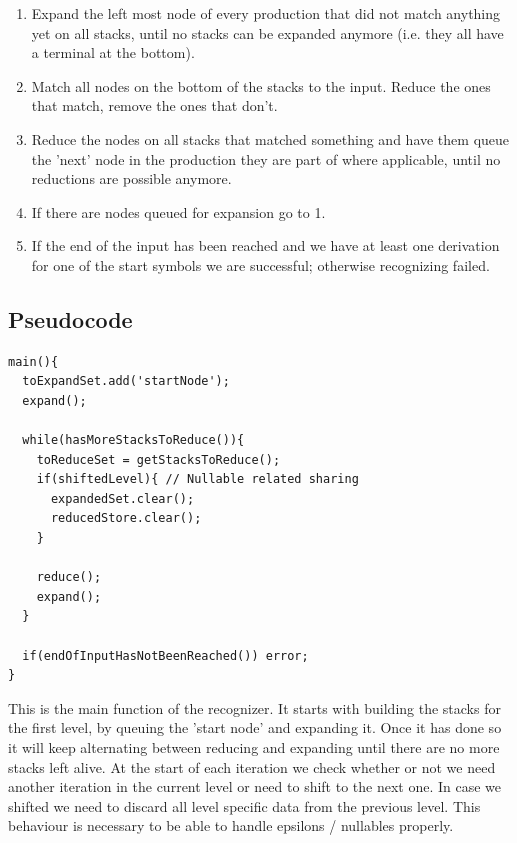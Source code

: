 \documentclass[a4paper,10pt]{article}
\begin{document}
\begin{enumerate}
 \setlength{\itemsep}{0pt}
 \setlength{\parskip}{0pt}
 \setlength{\parsep}{0pt}

 \item Expand the left most node of every production that did not match anything yet on all stacks, until no stacks can be expanded anymore (i.e. they all have a terminal at the bottom).
 \item Match all nodes on the bottom of the stacks to the input. Reduce the ones that match, remove the ones that don't.
 \item Reduce the nodes on all stacks that matched something and have them queue the 'next' node in the production they are part of where applicable, until no reductions are possible anymore.
 \item If there are nodes queued for expansion go to 1.
 \item If the end of the input has been reached and we have at least one derivation for one of the start symbols we are successful; otherwise recognizing failed.
\end{enumerate}

\subsection{Pseudocode}

{\small
\begin{verbatim}
main(){
  toExpandSet.add('startNode');
  expand();
  
  while(hasMoreStacksToReduce()){
    toReduceSet = getStacksToReduce();
    if(shiftedLevel){ // Nullable related sharing
      expandedSet.clear();
      reducedStore.clear();
    }
    
    reduce();
    expand();
  }
  
  if(endOfInputHasNotBeenReached()) error;
}
\end{verbatim}
}

This is the main function of the recognizer. It starts with building the stacks for the first level, by queuing the 'start node' and expanding it. Once it has done so it will keep alternating between reducing and expanding until there are no more stacks left alive. At the start of each iteration we check whether or not we need another iteration in the current level or need to shift to the next one. In case we shifted we need to discard all level specific data from the previous level. This behaviour is necessary to be able to handle epsilons / nullables properly.
\end{document}

